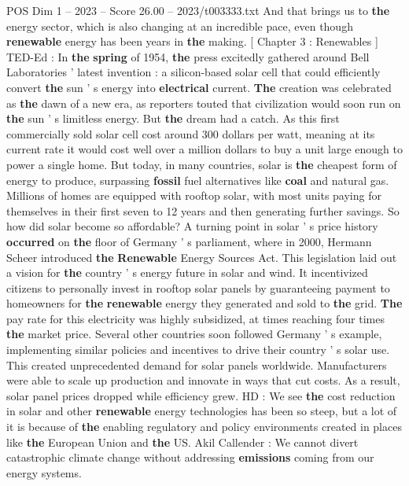 \begin{textsample}{POS Dim 1 – 2023 – Score 26.00 – 2023/t003333.txt}
And that brings us to \textbf{the} energy sector, which is also changing at an incredible pace, even though \textbf{renewable} energy has been years in \textbf{the} making. [ Chapter 3 : Renewables ] TED-Ed : In \textbf{the} \textbf{spring} of 1954, \textbf{the} press excitedly gathered around Bell Laboratories ' latest invention : a silicon-based solar cell that could efficiently convert \textbf{the} sun ' s energy into \textbf{electrical} current. \textbf{The} creation was celebrated as \textbf{the} dawn of a new era, as reporters touted that civilization would soon run on \textbf{the} sun ' s limitless energy.
But \textbf{the} dream had a catch.
As this first commercially sold solar cell cost around 300 dollars per watt, meaning at its current rate it would cost well over a million dollars to buy a unit large enough to power a single home.
But today, in many countries, solar is \textbf{the} cheapest form of energy to produce, surpassing \textbf{fossil} fuel alternatives like \textbf{coal} and natural gas.
Millions of homes are equipped with rooftop solar, with most units paying for themselves in their first seven to 12 years and then generating further savings.
So how did solar become so affordable?
A turning point in solar ' s price history \textbf{occurred} on \textbf{the} floor of Germany ' s parliament, where in 2000, Hermann Scheer introduced \textbf{the} \textbf{Renewable} Energy Sources Act.
This legislation laid out a vision for \textbf{the} country ' s energy future in solar and wind.
It incentivized citizens to personally invest in rooftop solar panels by guaranteeing payment to homeowners for \textbf{the} \textbf{renewable} energy they generated and sold to \textbf{the} grid. \textbf{The} pay rate for this electricity was highly subsidized, at times reaching four times \textbf{the} market price.
Several other countries soon followed Germany ' s example, implementing similar policies and incentives to drive their country ' s solar use.
This created unprecedented demand for solar panels worldwide.
Manufacturers were able to scale up production and innovate in ways that cut costs.
As a result, solar panel prices dropped while efficiency grew.
HD : We see \textbf{the} cost reduction in solar and other \textbf{renewable} energy technologies has been so steep, but a lot of it is because of \textbf{the} enabling regulatory and policy environments created in places like \textbf{the} European Union and \textbf{the} US.
Akil Callender : We cannot divert catastrophic climate change without addressing \textbf{emissions} coming from our energy systems.

\end{textsample}
